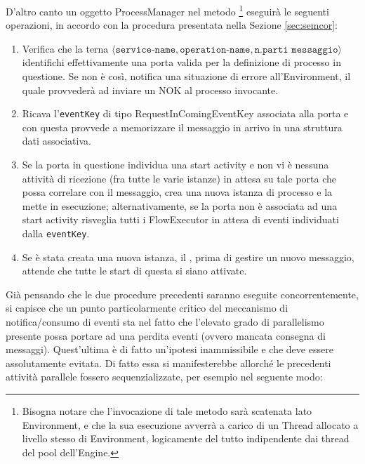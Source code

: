 D'altro canto un oggetto ProcessManager nel metodo
\footnote{Bisogna notare che l'invocazione di
tale metodo sarà scatenata lato Environment, e che la sua esecuzione avverrà a
carico di un Thread allocato a livello stesso di Environment, logicamente del
tutto indipendente dai thread del pool dell'Engine.} eseguirà le seguenti
operazioni, in accordo con la procedura presentata nella Sezione \ref{sec:semcor}:

\begin{enumerate}
  \item Verifica che la terna $\langle \texttt{service-name},
  \texttt{operation-name}, \texttt{n.parti messaggio} \rangle$  identifichi
  effettivamente una porta valida per la definizione di processo in questione. 
  Se non \`e così, notifica una situazione di errore all'Environment, il quale
  provvederà ad inviare un NOK al processo invocante.
 
 \item Ricava l'\texttt{eventKey} di tipo RequestInComingEventKey associata
 alla porta e con questa provvede a memorizzare il messaggio in arrivo in 
 una struttura dati associativa.
 
 \item Se la porta in questione individua una start activity e non vi è nessuna attività di
 ricezione (fra tutte le varie istanze) in attesa su tale porta che possa
 correlare con il messaggio, crea una nuova istanza di processo e la mette in
 esecuzione; alternativamente, se la porta non \`e associata ad una start
 activity risveglia tutti i FlowExecutor in attesa di eventi individuati dalla \texttt{eventKey}.
 
 \item Se è stata creata una nuova istanza, il , prima di
 gestire un nuovo messaggio, attende che tutte le start 
 di questa si siano attivate. 
\end{enumerate}

Già pensando che le due procedure precedenti saranno eseguite concorrentemente,
si capisce che un punto particolarmente critico del meccanismo di
notifica/consumo di eventi sta nel fatto che l'elevato grado di parallelismo
presente possa portare ad una perdita eventi (ovvero mancata consegna di
messaggi). Quest'ultima \`e di fatto un'ipotesi inammissibile e che deve
essere assolutamente evitata. Di fatto essa si manifesterebbe allorché le precedenti
attività parallele fossero sequenzializzate, per esempio nel seguente modo:


